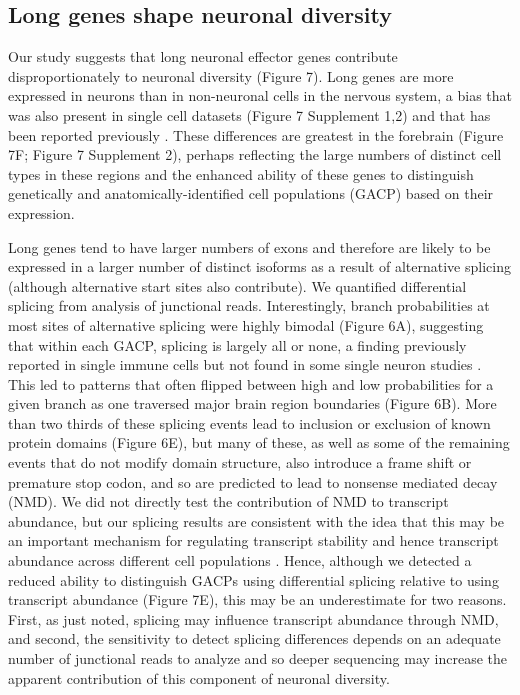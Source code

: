 \subsection{Long genes shape neuronal diversity}
Our study suggests that long neuronal effector genes contribute disproportionately to neuronal diversity (Figure 7). Long genes are more expressed in neurons than in non-neuronal cells in the nervous system, a bias that was also present in single cell datasets (Figure 7 Supplement 1,2) and that has been reported previously \cite{Sugino_2014,Gabel_2015,Zylka_2015}. These differences are greatest in the forebrain (Figure 7F; Figure 7 Supplement 2), perhaps reflecting the large numbers of distinct cell types in these regions and the enhanced ability of these genes to distinguish genetically and anatomically-identified cell populations (GACP) based on their expression. 

Long genes tend to have larger numbers of exons and therefore are likely to be expressed in a larger number of distinct isoforms as a result of alternative splicing (although alternative start sites also contribute). We quantified differential splicing from analysis of junctional reads. Interestingly, branch probabilities at most sites of alternative splicing were highly bimodal (Figure 6A), suggesting that within each GACP, splicing is largely all or none, a finding previously reported in single immune cells \cite{Shalek_2013} but not found in some single neuron studies \cite{Gokce_2016}. This led to patterns that often flipped between high and low probabilities for a given branch as one traversed major brain region boundaries (Figure 6B). More than two thirds of these splicing events lead to inclusion or exclusion of known protein domains (Figure 6E), but many of these, as well as some of the remaining events that do not modify domain structure, also introduce a frame shift or premature stop codon, and so are predicted to lead to nonsense mediated decay (NMD). We did not directly test the contribution of NMD to transcript abundance, but our splicing results are consistent with the idea that this may be an important mechanism for regulating transcript stability and hence transcript abundance across different cell populations \citep{Yan_2015,Traunmuller_2014}. Hence, although we detected a reduced ability to distinguish GACPs using differential splicing relative to using transcript abundance (Figure 7E), this may be an underestimate for two reasons. First, as just noted, splicing may influence transcript abundance through NMD, and second, the sensitivity to detect splicing differences depends on an adequate number of junctional reads to analyze and so deeper sequencing may increase the apparent contribution of this component of neuronal diversity.     

